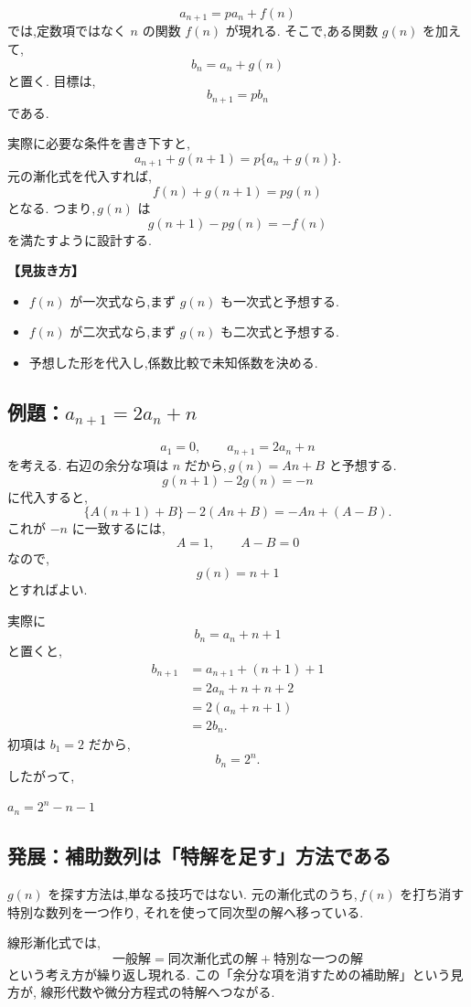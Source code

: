 \[
  a_{n+1}=pa_n+f(n)
\]
では,定数項ではなく $n$ の関数 $f(n)$ が現れる.
そこで,ある関数 $g(n)$ を加えて,
\[
  b_n=a_n+g(n)
\]
と置く.
目標は,
\[
  b_{n+1}=pb_n
\]
である.

実際に必要な条件を書き下すと,
\[
  a_{n+1}+g(n+1)=p\{a_n+g(n)\}.
\]
元の漸化式を代入すれば,
\[
  f(n)+g(n+1)=pg(n)
\]
となる.
つまり,\,$g(n)$ は
\[
  g(n+1)-pg(n)=-f(n)
\]
を満たすように設計する.

\noindent\textbf{【見抜き方】}

\begin{itemize}
  \item $f(n)$ が一次式なら,まず $g(n)$ も一次式と予想する.
  \item $f(n)$ が二次式なら,まず $g(n)$ も二次式と予想する.
  \item 予想した形を代入し,係数比較で未知係数を決める.
\end{itemize}

\subsection{例題：$a_{n+1}=2a_n+n$}

\[
  a_1=0,\qquad a_{n+1}=2a_n+n
\]
を考える.
右辺の余分な項は $n$ だから,\,$g(n)=An+B$ と予想する.
\[
  g(n+1)-2g(n)=-n
\]
に代入すると,
\[
  \{A(n+1)+B\}-2(An+B)
  =-An+(A-B).
\]
これが $-n$ に一致するには,
\[
  A=1,\qquad A-B=0
\]
なので,
\[
  g(n)=n+1
\]
とすればよい.

実際に
\[
  b_n=a_n+n+1
\]
と置くと,
\[
\begin{aligned}
  b_{n+1}
  &=a_{n+1}+(n+1)+1\\
  &=2a_n+n+n+2\\
  &=2(a_n+n+1)\\
  &=2b_n.
\end{aligned}
\]
初項は $b_1=2$ だから,
\[
  b_n=2^n.
\]
したがって,
\begin{mdquote}
  $a_n=2^n-n-1$
\end{mdquote}

\subsection{発展：補助数列は「特解を足す」方法である}

$g(n)$ を探す方法は,単なる技巧ではない.
元の漸化式のうち,\,$f(n)$ を打ち消す特別な数列を一つ作り,
それを使って同次型の解へ移っている.

線形漸化式では,
\[
  \text{一般解}
  =
  \text{同次漸化式の解}
  +
  \text{特別な一つの解}
\]
という考え方が繰り返し現れる.
この「余分な項を消すための補助解」という見方が,
線形代数や微分方程式の特解へつながる.

